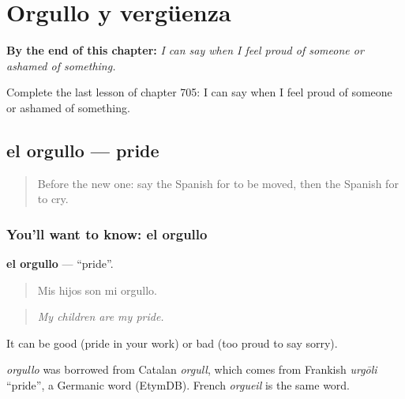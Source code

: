 
\chapter{Orgullo y vergüenza}
\label{ch:es-orgullo-y-verguenza}

\begin{chapteropening}
\textbf{By the end of this chapter:} \emph{I can say when I feel proud of someone or ashamed of something.}

Complete the last lesson of chapter 705: I can say when I feel proud of someone or ashamed of something.
\end{chapteropening}

\section[el orgullo]{el orgullo — pride}

\label{lesson:ES-C705-orgullo}



\begin{quote}
Before the new one: say the Spanish for to be moved, then the Spanish for to cry.
\end{quote}

\subsection*{You'll want to know: el orgullo}
\textbf{el orgullo} — \textquotedblleft{}pride\textquotedblright{}.

\begin{quote}
Mis hijos son mi orgullo.
\end{quote}

\begin{quote}
\emph{My children are my pride.}
\end{quote}

It can be good (pride in your work) or bad (too proud to say sorry).

\begin{cousinweb}
\emph{orgullo} was borrowed from Catalan \emph{orgull}, which comes from Frankish \emph{urgōli} \textquotedblleft{}pride\textquotedblright{}, a Germanic word (EtymDB). French \emph{orgueil} is the same word.
\end{cousinweb}

